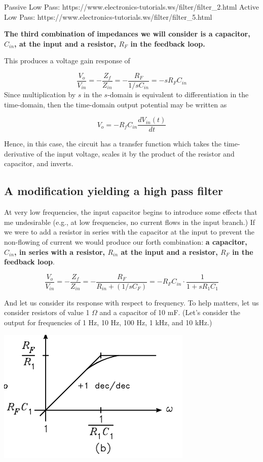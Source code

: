 \documentclass[11pt]{book}
\begin{document}
Passive Low Pass: https://www.electronics-tutorials.ws/filter/filter\_2.html
Active Low Pass: https://www.electronics-tutorials.ws/filter/filter\_5.html

\textbf{The third combination of impedances we will consider is a capacitor, $C_{in}$, at the input and a resistor, $R_F$ in the feedback loop.}

This produces a voltage gain response of

\begin{equation}
	\frac{V_o}{V_{in}} = -\frac{Z_f}{Z_{in}} = -\frac{R_F}{1/sC_{in}} = -sR_FC_{in}
\end{equation}
Since multiplication by $s$ in the $s$-domain is equivalent to differentiation in the time-domain, then the time-domain output potential may be written as

\begin{equation}
	V_o = -R_fC_{in}\frac{d V_{in}(t)}{dt}
\end{equation}

Hence, in this case, the circuit has a transfer function which takes the time-derivative of the input voltage, scales it by the product of the resistor and capacitor, and inverts.

\subsection{A modification yielding a high pass filter}
At very low frequencies, the input capacitor begins to introduce some effects that me undesirable (e.g., at low frequencies, no current flows in the input branch.) If we were to add a resistor in series with the capacitor at the input to prevent the non-flowing of current we would produce our forth combination: \textbf{a capacitor, $C_{in}$, in series with a resistor, $R_{in}$ at the input and a resistor, $R_F$ in the feedback loop}.

\begin{equation}
	\frac{V_o}{V_{in}} = -\frac{Z_f}{Z_{in}} = -\frac{R_F}{R_{in} + (1/sC_F)} = -R_FC_{in}\cdot\frac{1}{1 + sR_1C_1}
\end{equation}

And let us consider its response with respect to frequency. To help matters, let us consider resistors of value 1 $\Omega$ and a capacitor of 10 mF. (Let's consider the output for frequencies of 1 Hz, 10 Hz, 100 Hz, 1 kHz, and 10 kHz.)

\begin{center}\includegraphics{figures/15.03.png}\end{center}
\end{document}
